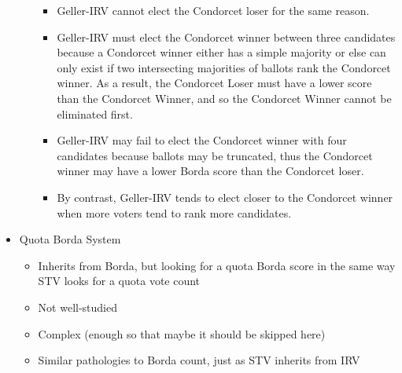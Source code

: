 \begin{itemize}
\begin{itemize}
\begin{itemize}
            \item Geller-IRV cannot elect the Condorcet loser for the same reason.

            \item Geller-IRV must elect the Condorcet winner between three candidates because a Condorcet winner either has a simple majority or else can only exist if two intersecting majorities of ballots rank the Condorcet winner.  As a result, the Condorcet Loser must have a lower score than the Condorcet Winner, and so the Condorcet Winner cannot be eliminated first.

            \item Geller-IRV may fail to elect the Condorcet winner with four candidates because ballots may be truncated, thus the Condorcet winner may have a lower Borda score than the Condorcet loser.

            \item By contrast, Geller-IRV tends to elect closer to the Condorcet winner when more voters tend to rank more candidates.
        \end{itemize}

    \end{itemize}

%
%

    \item Quota Borda System
    \begin{itemize}
        \item Inherits from Borda, but looking for a quota Borda score in the same way STV looks for a quota vote count

        \item Not well-studied

        \item Complex (enough so that maybe it should be skipped here)

        \item Similar pathologies to Borda count, just as STV inherits from IRV
    \end{itemize}
\end{itemize}



